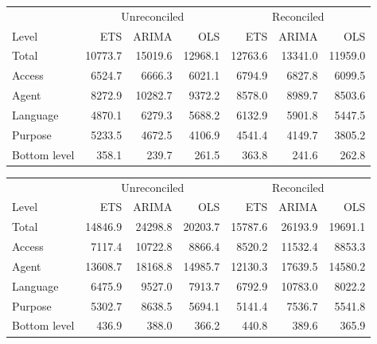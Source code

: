 \documentclass[11pt,a4paper,]{article}
\let\origtable\table
\let\endorigtable\endtable
\renewenvironment{table}[1][2] {
    \expandafter\origtable\expandafter[!htbp]
} {
    \endorigtable
}
\begin{document}
\begin{table}[!h]

\caption{\label{tab:wikipediadataresulrolling}Mean RMSE for ETS, ARIMA and OLS with and without reconciliation - Rolling origin - Wikipedia dataset}
\centering
\begin{tabular}[t]{lrrrrrr}
\toprule
\multicolumn{1}{c}{} & \multicolumn{3}{c}{Unreconciled} & \multicolumn{3}{c}{Reconciled} \\
\cmidrule(l{3pt}r{3pt}){2-4} \cmidrule(l{3pt}r{3pt}){5-7}
Level & ETS & ARIMA & OLS & ETS & ARIMA & OLS\\
\midrule
Total & 10773.7 & 15019.6 & 12968.1 & 12763.6 & 13341.0 & 11959.0\\
Access & 6524.7 & 6666.3 & 6021.1 & 6794.9 & 6827.8 & 6099.5\\
Agent & 8272.9 & 10282.7 & 9372.2 & 8578.0 & 8989.7 & 8503.6\\
Language & 4870.1 & 6279.3 & 5688.2 & 6132.9 & 5901.8 & 5447.5\\
Purpose & 5233.5 & 4672.5 & 4106.9 & 4541.4 & 4149.7 & 3805.2\\
Bottom level & 358.1 & 239.7 & 261.5 & 363.8 & 241.6 & 262.8\\
\bottomrule
\end{tabular}
\end{table}

\begin{table}

\caption{\label{tab:wikipediadataresultRMSE}Mean RMSE for ETS, ARIMA and OLS with and without reconciliation - Fixed origin - Wikipedia dataset}
\centering
\begin{tabular}[t]{lrrrrrr}
\toprule
\multicolumn{1}{c}{} & \multicolumn{3}{c}{Unreconciled} & \multicolumn{3}{c}{Reconciled} \\
\cmidrule(l{3pt}r{3pt}){2-4} \cmidrule(l{3pt}r{3pt}){5-7}
Level & ETS & ARIMA & OLS & ETS & ARIMA & OLS\\
\midrule
Total & 14846.9 & 24298.8 & 20203.7 & 15787.6 & 26193.9 & 19691.1\\
Access & 7117.4 & 10722.8 & 8866.4 & 8520.2 & 11532.4 & 8853.3\\
Agent & 13608.7 & 18168.8 & 14985.7 & 12130.3 & 17639.5 & 14580.2\\
Language & 6475.9 & 9527.0 & 7913.7 & 6792.9 & 10783.0 & 8022.2\\
Purpose & 5302.7 & 8638.5 & 5694.1 & 5141.4 & 7536.7 & 5541.8\\
Bottom level & 436.9 & 388.0 & 366.2 & 440.8 & 389.6 & 365.9\\
\bottomrule
\end{tabular}
\end{table}
\end{document}
